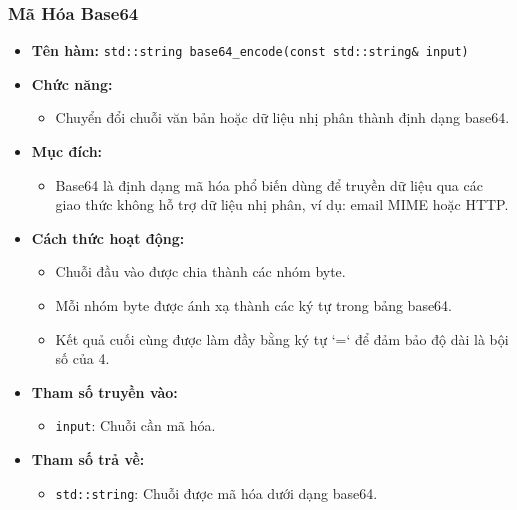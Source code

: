 \subsubsection{Mã Hóa Base64}
\begin{itemize}
    \item \textbf{Tên hàm:} \texttt{std::string base64\_encode(const std::string\& input)}
    \item \textbf{Chức năng:} 
    \begin{itemize}
        \item Chuyển đổi chuỗi văn bản hoặc dữ liệu nhị phân thành định dạng base64.
    \end{itemize}
    \item \textbf{Mục đích:} 
    \begin{itemize}
        \item Base64 là định dạng mã hóa phổ biến dùng để truyền dữ liệu qua các giao thức không hỗ trợ dữ liệu nhị phân, ví dụ: email MIME hoặc HTTP.
    \end{itemize}
    \item \textbf{Cách thức hoạt động:} 
    \begin{itemize}
        \item Chuỗi đầu vào được chia thành các nhóm byte.
        \item Mỗi nhóm byte được ánh xạ thành các ký tự trong bảng base64.
        \item Kết quả cuối cùng được làm đầy bằng ký tự `=` để đảm bảo độ dài là bội số của 4.
    \end{itemize}
    \item \textbf{Tham số truyền vào:} 
    \begin{itemize}
        \item \texttt{input}: Chuỗi cần mã hóa.
    \end{itemize}
    \item \textbf{Tham số trả về:} 
    \begin{itemize}
        \item \texttt{std::string}: Chuỗi được mã hóa dưới dạng base64.
    \end{itemize}
\end{itemize}

